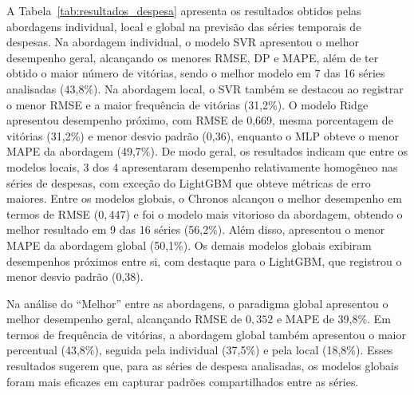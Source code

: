 \documentclass[12pt]{article}
\begin{document}
A Tabela~\ref{tab:resultados_despesa} apresenta os resultados obtidos pelas abordagens individual, local e global na previsão das séries temporais de despesas. Na abordagem individual, o modelo SVR apresentou o melhor desempenho geral, alcançando os menores RMSE, DP e MAPE, além de ter obtido o maior número de vitórias, sendo o melhor modelo em 7 das 16 séries analisadas (43,8$\%$). Na abordagem local, o SVR também se destacou ao registrar o menor RMSE e a maior frequência de vitórias (31,2$\%$). O modelo Ridge apresentou desempenho próximo, com RMSE de 0,669, mesma porcentagem de vitórias (31,2$\%$) e menor desvio padrão (0,36), enquanto o MLP obteve o menor MAPE da abordagem (49,7$\%$). De modo geral, os resultados indicam que entre os modelos locais, 3 dos 4 apresentaram desempenho relativamente homogêneo nas séries de despesas, com exceção do LightGBM que obteve métricas de erro maiores. Entre os modelos globais, o Chronos alcançou o melhor desempenho em termos de RMSE ($0,447$) e foi o modelo mais vitorioso da abordagem, obtendo o melhor resultado em 9 das 16 séries (56,2\%). Além disso, apresentou o menor MAPE da abordagem global (50,1\%). Os demais modelos globais exibiram desempenhos próximos entre si, com destaque para o LightGBM, que registrou o menor desvio padrão (0,38).

Na análise do ``Melhor'' entre as abordagens, o paradigma global apresentou o melhor desempenho geral, alcançando RMSE de $0,352$ e MAPE de 39,8\%. Em termos de frequência de vitórias, a abordagem global também apresentou o maior percentual (43,8\%), seguida pela individual (37,5\%) e pela local (18,8\%). Esses resultados sugerem que, para as séries de despesa analisadas, os modelos globais foram mais eficazes em capturar padrões compartilhados entre as séries.
\end{document}
